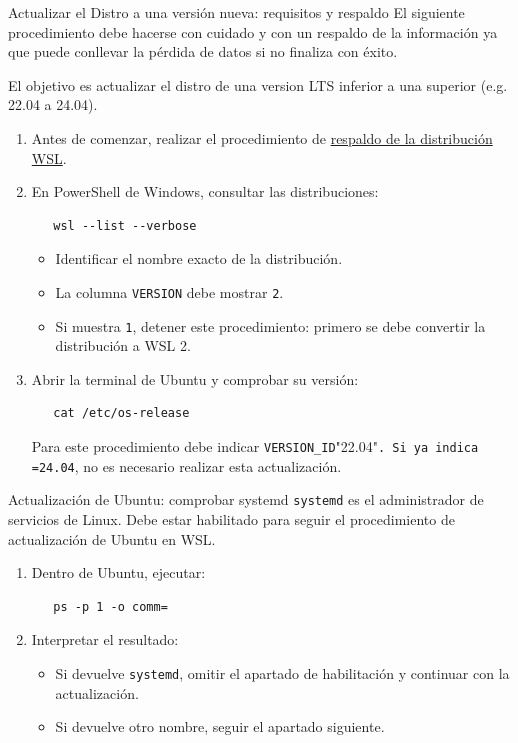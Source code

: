 \documentclass[presentation]{beamer}
\begin{document}
\begin{frame}{Actualizar el Distro a una versión nueva: requisitos y respaldo}
 El siguiente procedimiento debe hacerse con cuidado y con un respaldo
de la información ya que puede conllevar la pérdida de datos si no
finaliza con éxito.

El objetivo es actualizar el distro de una version LTS inferior a una
superior (e.g. 22.04 a 24.04).

\begin{enumerate}
\item Antes de comenzar, realizar el procedimiento de
\hyperlink{org4afddf5}{respaldo de la distribución WSL}.

\item En PowerShell de Windows, consultar las distribuciones:

\begin{verbatim}
   wsl --list --verbose
\end{verbatim}

\begin{itemize}
\item Identificar el nombre exacto de la distribución.
\item La columna \texttt{VERSION} debe mostrar \texttt{2}.
\item Si muestra \texttt{1}, detener este procedimiento: primero se debe
convertir la distribución a WSL 2.
\end{itemize}

\item Abrir la terminal de Ubuntu y comprobar su versión:

\begin{verbatim}
   cat /etc/os-release
\end{verbatim}

Para este procedimiento debe indicar \texttt{VERSION\_ID}"22.04"\texttt{.
   Si ya indica =24.04}, no es necesario realizar esta actualización.
\end{enumerate}
\end{frame}

\begin{frame}{Actualización de Ubuntu: comprobar systemd}
 \texttt{systemd} es el administrador de servicios de Linux. Debe estar
habilitado para seguir el procedimiento de actualización de Ubuntu
en WSL.

\begin{enumerate}
\item Dentro de Ubuntu, ejecutar:

\begin{verbatim}
   ps -p 1 -o comm=
\end{verbatim}

\item Interpretar el resultado:
\begin{itemize}
\item Si devuelve \texttt{systemd}, omitir el apartado de habilitación y
continuar con la actualización.
\item Si devuelve otro nombre, seguir el apartado siguiente.
\end{itemize}
\end{enumerate}
\end{frame}
\end{document}
